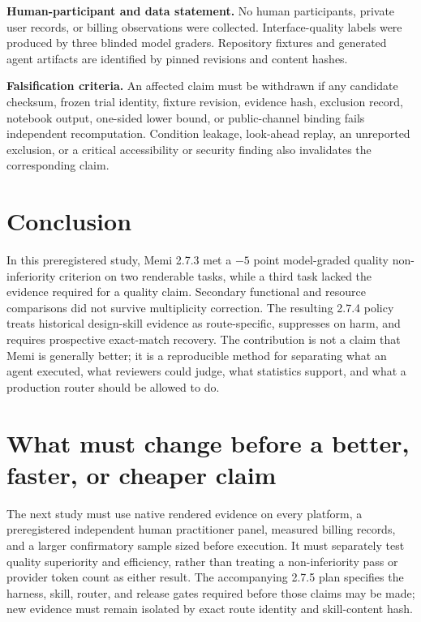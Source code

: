 \documentclass[9pt,twocolumn]{extarticle}
\begin{document}
\textbf{Human-participant and data statement.} No human participants, private
user records, or billing observations were collected. Interface-quality labels
were produced by three blinded model graders. Repository fixtures and generated
agent artifacts are identified by pinned revisions and content hashes.

\textbf{Falsification criteria.} An affected claim must be withdrawn if any
candidate checksum, frozen trial identity, fixture revision, evidence hash,
exclusion record, notebook output, one-sided lower bound, or public-channel
binding fails independent recomputation. Condition leakage, look-ahead replay,
an unreported exclusion, or a critical accessibility or security finding also
invalidates the corresponding claim.

\section{Conclusion}

In this preregistered study, Memi 2.7.3 met a $-5$ point model-graded quality
non-inferiority criterion on two renderable tasks, while a third task lacked
the evidence required for a quality claim. Secondary functional and resource
comparisons did not survive multiplicity correction. The resulting 2.7.4
policy treats historical design-skill evidence as route-specific, suppresses on
harm, and requires prospective exact-match recovery. The contribution is not a
claim that Memi is generally better; it is a reproducible method for separating
what an agent executed, what reviewers could judge, what statistics support,
and what a production router should be allowed to do.

\section*{What must change before a better, faster, or cheaper claim}

The next study must use native rendered evidence on every platform, a
preregistered independent human practitioner panel, measured billing records,
and a larger confirmatory sample sized before execution. It must separately
test quality superiority and efficiency, rather than treating a non-inferiority
pass or provider token count as either result. The accompanying 2.7.5 plan
specifies the harness, skill, router, and release gates required before those
claims may be made; new evidence must remain isolated by exact route identity
and skill-content hash.
\end{document}

